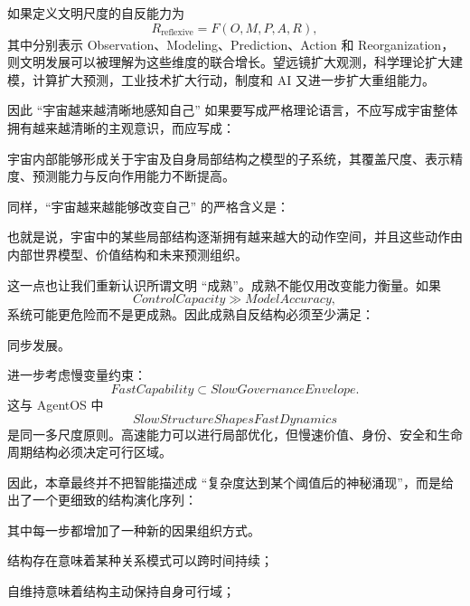 如果定义文明尺度的自反能力为
\[
R_{\mathrm{reflexive}}
=
F(
O,
M,
P,
A,
R
),
\]
其中分别表示 Observation、Modeling、Prediction、Action 和 Reorganization，则文明发展可以被理解为这些维度的联合增长。望远镜扩大观测，科学理论扩大建模，计算扩大预测，工业技术扩大行动，制度和 AI 又进一步扩大重组能力。

因此 ``宇宙越来越清晰地感知自己'' 如果要写成严格理论语言，不应写成宇宙整体拥有越来越清晰的主观意识，而应写成：
\begin{statementbox}
宇宙内部能够形成关于宇宙及自身局部结构之模型的子系统，其覆盖尺度、表示精度、预测能力与反向作用能力不断提高。
\end{statementbox}

同样，``宇宙越来越能够改变自己'' 的严格含义是：
\begin{statementbox}
\centering
{}
\end{statementbox}
也就是说，宇宙中的某些局部结构逐渐拥有越来越大的动作空间，并且这些动作由内部世界模型、价值结构和未来预测组织。

这一点也让我们重新认识所谓文明 ``成熟''。成熟不能仅用改变能力衡量。如果
\[
ControlCapacity
\gg
ModelAccuracy,
\]
系统可能更危险而不是更成熟。因此成熟自反结构必须至少满足：
\begin{statementbox}
\centering
{}
\end{statementbox}
同步发展。

进一步考虑慢变量约束：
\[
FastCapability
\subset
SlowGovernanceEnvelope.
\]
这与 AgentOS 中
\[
SlowStructureShapesFastDynamics
\]
是同一多尺度原则。高速能力可以进行局部优化，但慢速价值、身份、安全和生命周期结构必须决定可行区域。

因此，本章最终并不把智能描述成 ``复杂度达到某个阈值后的神秘涌现''，而是给出了一个更细致的结构演化序列：
\begin{statementbox}
\centering
{}
\end{statementbox}

其中每一步都增加了一种新的因果组织方式。

结构存在意味着某种关系模式可以跨时间持续；

自维持意味着结构主动保持自身可行域；

